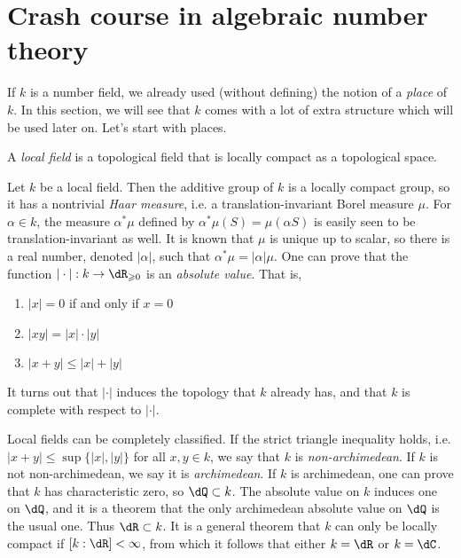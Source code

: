 \documentclass{article}
\begin{document}
\section{Crash course in algebraic number theory}

If $k$ is a number field, we already used (without defining) the notion of a 
\emph{place} of $k$. In this section, we will see that $k$ comes with a lot of 
extra structure which will be used later on. Let's start with places. 

\begin{definition}
A \emph{local field} is a topological field that is locally compact as a 
topological space. 
\end{definition}

Let $k$ be a local field. Then the additive group of $k$ is a locally compact 
group, so it has a nontrivial \emph{Haar measure}, i.e. a 
translation-invariant Borel measure $\mu$. For $\alpha\in k$, the measure 
$\alpha^*\mu$ defined by $\alpha^* \mu(S) = \mu(\alpha S)$ is easily seen to 
be translation-invariant as well. It is known that $\mu$ is unique up to 
scalar, so there is a real number, denoted $|\alpha|$, such that 
$\alpha^*\mu = |\alpha|\mu$. One can prove that the function 
$|\cdot|:k\to \dR_{\geqslant 0}$ is an \emph{absolute value}. That is, 
\begin{enumerate}
  \item $|x|=0$ if and only if $x=0$
  \item $|x y| = |x|\cdot |y|$
  \item $|x+y|\leqslant |x|+|y|$
\end{enumerate}
It turns out that $|\cdot|$ induces the topology that $k$ already has, and 
that $k$ is complete with respect to $|\cdot|$. 

Local fields can be completely classified. If the strict triangle inequality 
holds, i.e. $|x+y|\leqslant \sup\{|x|,|y|\}$ for all $x,y\in k$, we say that 
$k$ is \emph{non-archimedean}. If $k$ is not non-archimedean, we say it is 
\emph{archimedean}. If $k$ is archimedean, one can prove that $k$ has 
characteristic zero, so $\dQ\subset k$. The absolute value on $k$ induces one 
on $\dQ$, and it is a theorem that the only archimedean absolute value on 
$\dQ$ is the usual one. Thus $\dR\subset k$. It is a general theorem that $k$ 
can only be locally compact if $[k:\dR]<\infty$, from which it follows that 
either $k=\dR$ or $k=\dC$. 
\end{document}
